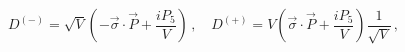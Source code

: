 \begin{equation}
D^{(-)}
=\sqrt{V}\left(- \vec{\sigma}\cdot\vec{P}+\frac{iP_{5}}{V}\right)\,,\quad  
D^{(+)} 
=V\left(\vec{\sigma}\cdot\vec{P}+\frac{iP_{5}}{V}\right)\frac{1}{\sqrt{V}}\,, 
\end{equation}

